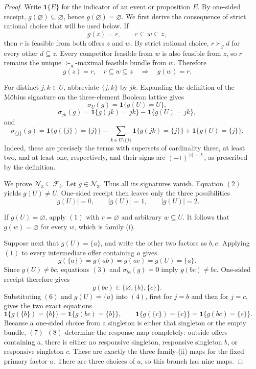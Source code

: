 \documentclass{article}
\begin{document}
\begin{proof}
Write \(\mathbf 1\{E\}\) for the indicator of an event or proposition
\(E\).  By one-sided receipt,
\(g(\varnothing)\subseteq\varnothing\), hence
\(g(\varnothing)=\varnothing\).  We first derive the consequence of
strict rational choice that will be used below.  If
\[
g(z)=r,
\qquad
r\subseteq w\subseteq z,
\]
then \(r\) is feasible from both offers \(z\) and \(w\).  By strict
rational choice, \(r\succ_g d\) for every other \(d\subseteq z\).
Every competitor feasible from \(w\) is also feasible from \(z\), so
\(r\) remains the unique \(\succ_g\)-maximal feasible bundle from
\(w\).  Therefore
\[
g(z)=r,\quad r\subseteq w\subseteq z
\quad\Longrightarrow\quad
g(w)=r. \tag{1}
\]

For distinct \(j,k\in U\), abbreviate \(\{j,k\}\) by \(jk\).
Expanding the definition of the Möbius signature on the three-element
Boolean lattice gives
\[
\sigma_U(g)=\mathbf 1\{g(U)=U\}, \tag{2}
\]
\[
\sigma_{jk}(g)
=\mathbf 1\{g(jk)=jk\}-\mathbf 1\{g(U)=jk\}, \tag{3}
\]
and
\[
\sigma_{\{j\}}(g)
=\mathbf 1\{g(\{j\})=\{j\}\}
-\sum_{k\in U\setminus\{j\}}
 \mathbf 1\{g(jk)=\{j\}\}
+\mathbf 1\{g(U)=\{j\}\}. \tag{4}
\]
Indeed, these are precisely the terms with supersets of cardinality
three, at least two, and at least one, respectively, and their signs
are \((-1)^{|z|-|t|}\), as prescribed by the definition.

We prove \(\mathcal N_3\subseteq\mathcal F_3\).  Let
\(g\in\mathcal N_3\).  Thus all its signatures vanish.  Equation
\((2)\) yields \(g(U)\ne U\).  One-sided receipt then leaves only the
three possibilities
\[
|g(U)|=0,
\qquad
|g(U)|=1,
\qquad
|g(U)|=2. \tag{5}
\]

If \(g(U)=\varnothing\), apply \((1)\) with
\(r=\varnothing\) and arbitrary \(w\subseteq U\).  It follows that
\(g(w)=\varnothing\) for every \(w\), which is family (i).

Suppose next that \(g(U)=\{a\}\), and write the other two factors as
\(b,c\).  Applying \((1)\) to every intermediate offer containing
\(a\) gives
\[
g(\{a\})=g(ab)=g(ac)=g(U)=\{a\}. \tag{6}
\]
Since \(g(U)\ne bc\), equations \((3)\) and
\(\sigma_{bc}(g)=0\) imply \(g(bc)\ne bc\).  One-sided receipt
therefore gives
\[
g(bc)\in\{\varnothing,\{b\},\{c\}\}. \tag{7}
\]
Substituting \((6)\) and \(g(U)=\{a\}\) into \((4)\), first for
\(j=b\) and then for \(j=c\), gives the two exact equations
\[
\mathbf 1\{g(\{b\})=\{b\}\}
=\mathbf 1\{g(bc)=\{b\}\},
\qquad
\mathbf 1\{g(\{c\})=\{c\}\}
=\mathbf 1\{g(bc)=\{c\}\}. \tag{8}
\]
Because a one-sided choice from a singleton is either that singleton
or the empty bundle, \((7)\)--\((8)\) determine the response map
completely: outside offers containing \(a\), there is either no
responsive singleton, responsive singleton \(b\), or responsive
singleton \(c\).  These are exactly the three family-(ii) maps for
the fixed primary factor \(a\).  There are three choices of \(a\), so
this branch has nine maps.


\end{proof}
\end{document}
